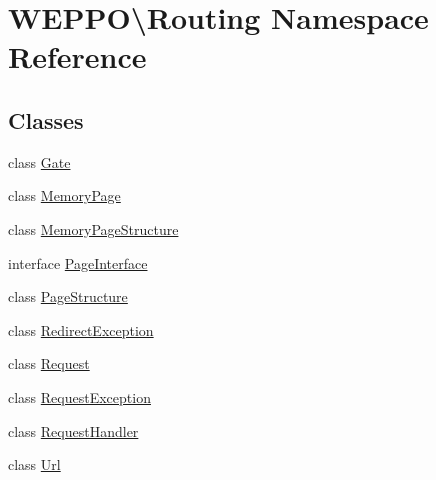\hypertarget{namespaceWEPPO_1_1Routing}{}\section{W\+E\+P\+PO\textbackslash{}Routing Namespace Reference}
\label{namespaceWEPPO_1_1Routing}
\subsection*{Classes}
\begin{DoxyCompactItemize}
\item 
class \hyperlink{classWEPPO_1_1Routing_1_1Gate}{Gate}
\item 
class \hyperlink{classWEPPO_1_1Routing_1_1MemoryPage}{Memory\+Page}
\item 
class \hyperlink{classWEPPO_1_1Routing_1_1MemoryPageStructure}{Memory\+Page\+Structure}
\item 
interface \hyperlink{interfaceWEPPO_1_1Routing_1_1PageInterface}{Page\+Interface}
\item 
class \hyperlink{classWEPPO_1_1Routing_1_1PageStructure}{Page\+Structure}
\item 
class \hyperlink{classWEPPO_1_1Routing_1_1RedirectException}{Redirect\+Exception}
\item 
class \hyperlink{classWEPPO_1_1Routing_1_1Request}{Request}
\item 
class \hyperlink{classWEPPO_1_1Routing_1_1RequestException}{Request\+Exception}
\item 
class \hyperlink{classWEPPO_1_1Routing_1_1RequestHandler}{Request\+Handler}
\item 
class \hyperlink{classWEPPO_1_1Routing_1_1Url}{Url}
\end{DoxyCompactItemize}
